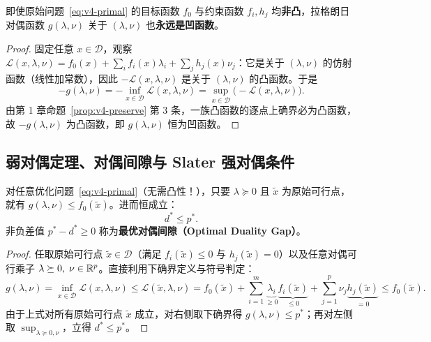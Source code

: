 \begin{thmBox}
\begin{theorem}[对偶函数的普适凹性]\label{thm:v4-dual-concave}
即使原始问题~\eqref{eq:v4-primal} 的目标函数 $f_0$ 与约束函数 $f_i, h_j$ 均\textbf{非凸}，拉格朗日对偶函数 $g(\lambda, \nu)$ 关于 $(\lambda, \nu)$ 也\textbf{永远是凹函数}。
\end{theorem}
\end{thmBox}

\begin{proof}
固定任意 $x \in \mathcal{D}$，观察 $\mathcal{L}(x, \lambda, \nu) = f_0(x) + \sum_i f_i(x)\lambda_i + \sum_j h_j(x)\nu_j$：它是关于 $(\lambda, \nu)$ 的仿射函数（线性加常数），因此 $-\mathcal{L}(x, \lambda, \nu)$ 是关于 $(\lambda, \nu)$ 的凸函数。于是
\[
  -g(\lambda, \nu) = -\inf_{x \in \mathcal{D}} \mathcal{L}(x, \lambda, \nu) = \sup_{x \in \mathcal{D}} \big(-\mathcal{L}(x, \lambda, \nu)\big).
\]
由第 1 章命题~\ref{prop:v4-preserve} 第 3 条，一族凸函数的逐点上确界必为凸函数，故 $-g(\lambda, \nu)$ 为凸函数，即 $g(\lambda, \nu)$ 恒为凹函数。
\end{proof}

\subsection{弱对偶定理、对偶间隙与 Slater 强对偶条件}

\begin{thmBox}
\begin{theorem}\label{thm:v4-weak-duality}
对任意优化问题~\eqref{eq:v4-primal}（无需凸性！），只要 $\lambda \succeq 0$ 且 $\tilde{x}$ 为原始可行点，就有 $g(\lambda, \nu) \le f_0(\tilde{x})$。进而恒成立：
\begin{equation}\label{eq:v4-weak-dual}
  d^* \le p^*.
\end{equation}
非负差值 $p^* - d^* \ge 0$ 称为\textbf{最优对偶间隙（Optimal Duality Gap）}。
\end{theorem}
\end{thmBox}

\begin{proof}
任取原始可行点 $\tilde{x} \in \mathcal{D}$（满足 $f_i(\tilde{x}) \le 0$ 与 $h_j(\tilde{x}) = 0$）以及任意对偶可行乘子 $\lambda \succeq 0,\; \nu \in \mathbb{R}^p$。直接利用下确界定义与符号判定：
\[
  g(\lambda, \nu) = \inf_{x \in \mathcal{D}} \mathcal{L}(x, \lambda, \nu)
  \le \mathcal{L}(\tilde{x}, \lambda, \nu)
  = f_0(\tilde{x}) + \sum_{i=1}^m \underbrace{\lambda_i}_{\ge 0}\underbrace{f_i(\tilde{x})}_{\le 0} + \sum_{j=1}^p \nu_j \underbrace{h_j(\tilde{x})}_{= 0}
  \le f_0(\tilde{x}).
\]
由于上式对所有原始可行点 $\tilde{x}$ 成立，对右侧取下确界得 $g(\lambda, \nu) \le p^*$；再对左侧取 $\sup_{\lambda \succeq 0, \nu}$，立得 $d^* \le p^*$。
\end{proof}

